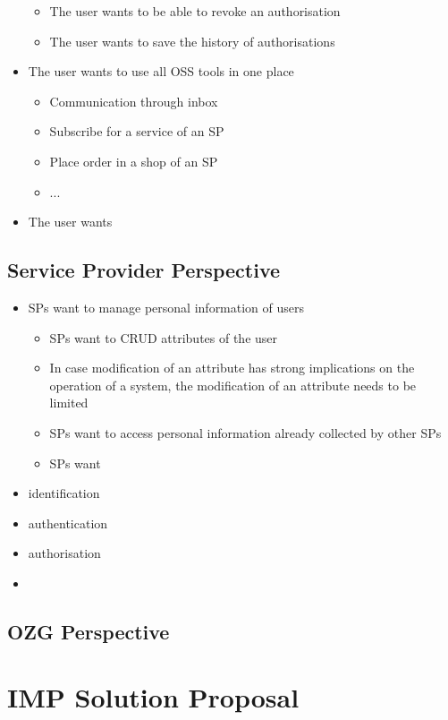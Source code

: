 \documentclass[
     12pt,         %
     a4paper,      %
     BCOR=10mm,version=first,     %
     DIV=14,version=first,        %
     ]{scrreprt}
\begin{document}
\begin{itemize}
\begin{itemize}
        \item The user wants to be able to revoke an authorisation
        \item The user wants to save the history of authorisations
    \end{itemize}
    \item The user wants to use all OSS tools in one place
    \begin{itemize}
        \item Communication through inbox
        \item Subscribe for a service of an SP
        \item Place order in a shop of an SP
        \item ...
    \end{itemize}
    \item The user wants

\end{itemize}

\subsection{Service Provider Perspective}

\begin{itemize}
    \item SPs want to manage personal information of users
    \begin{itemize}
        \item SPs want to CRUD attributes of the user
        \item In case modification of an attribute has strong implications on the operation of a system, the modification of an attribute needs to be limited
        \item SPs want to access personal information already collected by other SPs
        \item SPs want 
    \end{itemize}
    \item identification
    \item authentication
    \item authorisation
    \item 
\end{itemize}

\subsection{OZG Perspective}

\section{IMP Solution Proposal}
\end{document}
